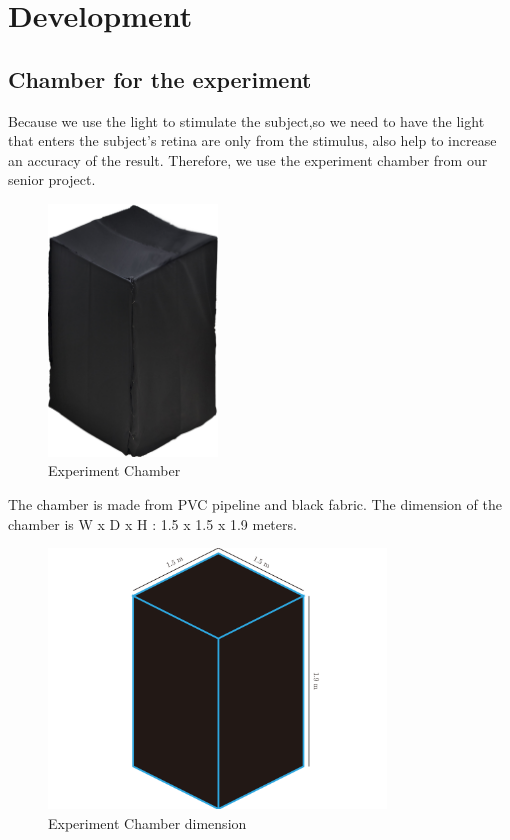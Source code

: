 \chapter{Development}

\label{ch:Development}

\setlength{\parindent}{4em}
\setlength{\parskip}{1em}
\renewcommand{\baselinestretch}{1.5}

\section{Chamber for the experiment}
\hspace{1.5cm}Because we use the light to stimulate the subject,so we need to have the light that enters the subject's retina are only from the stimulus, also help to increase an accuracy of the result. Therefore, we use the experiment chamber from our senior project.\cite{senior}\\
\begin{figure}[ht]
	\centering
	\includegraphics[width=0.4\textwidth]{chapter6/blackbox.jpg}
	\caption{Experiment Chamber}
\end{figure}
\hspace{1.5cm}The chamber is made from PVC pipeline and black fabric. The dimension of the chamber is W x D x H : 1.5 x 1.5 x 1.9 meters.\\
\begin{figure}[ht]
	\centering
	\includegraphics[width=0.8\textwidth]{chapter6/dark_wire.pdf}
	\caption{Experiment Chamber dimension}
\end{figure}
